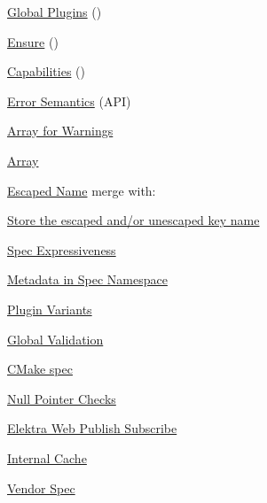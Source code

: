 \begin{DoxyItemize}
\item \hyperlink{doc_decisions_global_plugins_md}{Global Plugins} ()
\item \hyperlink{doc_decisions_ensure_md}{Ensure} ()
\item \hyperlink{doc_decisions_capabilities_md}{Capabilities} ()
\item \hyperlink{doc_decisions_error_semantics_md}{Error Semantics} (A\+PI)
\end{DoxyItemize}


\begin{DoxyItemize}
\item \hyperlink{doc_decisions_warning_array_md}{Array for Warnings}
\item \hyperlink{doc_decisions_array_md}{Array}
\end{DoxyItemize}


\begin{DoxyItemize}
\item \hyperlink{doc_decisions_escaped_name_md}{Escaped Name} merge with\+:
\item \hyperlink{doc_decisions_store_name_md}{Store the escaped and/or unescaped key name}
\item \hyperlink{doc_decisions_spec_expressiveness_md}{Spec Expressiveness}
\item \hyperlink{doc_decisions_spec_metadata_md}{Metadata in Spec Namespace}
\end{DoxyItemize}


\begin{DoxyItemize}
\item \hyperlink{doc_decisions_plugin_variants_md}{Plugin Variants}
\item \hyperlink{doc_decisions_global_validation_md}{Global Validation}
\end{DoxyItemize}


\begin{DoxyItemize}
\item \hyperlink{doc_decisions_cmake_spec_md}{C\+Make spec}
\item \hyperlink{doc_decisions_null_pointer_checks_md}{Null Pointer Checks}
\item \hyperlink{doc_decisions_elektra_web_pubsub_md}{Elektra Web Publish Subscribe}
\item \hyperlink{doc_decisions_internal_cache_md}{Internal Cache}
\item \hyperlink{doc_decisions_vendor_spec_md}{Vendor Spec} 
\end{DoxyItemize}